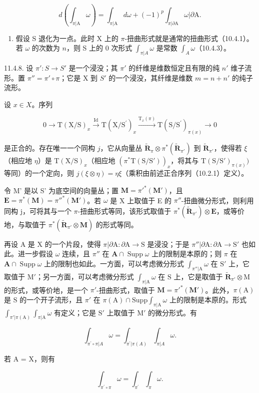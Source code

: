 \[
d \left(\int_ {\pi | \mathrm{A}} \omega\right) = \int_ {\pi | \mathrm{A}} d \omega + (- 1) ^ {p} \int_ {\pi | \partial \mathrm{A}} \omega | \partial \mathrm{A}.
\]

\begin{enumerate}
\def\labelenumi{\alph{enumi})}
\setcounter{enumi}{4}
\tightlist
\item
  假设 S 退化为一点。此时 X 上的 \(\pi\)-扭曲形式就是通常的扭曲形式（10.4.1）。若 \(\omega\) 的次数为 \(n\)，则 S 上的 0 次形式 \(\int_{\pi|A} \omega\) 是常数 \(\int_{A} \omega\)（10.4.3）。
\end{enumerate}

11.4.8. 设 \(\pi': S \to S'\) 是一个浸没；其 \(\pi'\) 的纤维是维数恒定且有限的纯 \(n'\) 维子流形。置 \(\pi'' = \pi' \circ \pi\)；它是 X 到 \(S'\) 的一个浸没，其纤维是维数 \(m = n + n'\) 的纯子流形。

设 \(x\in X\)。序列

\[
0 \longrightarrow \mathrm{T} (\mathrm{X} / \mathrm{S}) _ {x} \stackrel {\mathrm{Id}} {\longrightarrow} \mathrm{T} (\mathrm{X} / \mathrm{S} ^ {\prime}) _ {x} \stackrel {\mathrm{T} _ {x} (\pi)} {\longrightarrow} \mathrm{T} (\mathrm{S} / \mathrm{S} ^ {\prime}) _ {\pi (x)} \longrightarrow 0
\]

是正合的。存在唯一一个同构 \(j\)，它从向量丛 \(\tilde{\mathbf{R}}_{\pi} \otimes \pi^{*}(\tilde{\mathbf{R}}_{\pi'})\) 到 \(\tilde{\mathbf{R}}_{\pi'}\)，使得若 \(\xi\)（相应地 \(\eta\)）是 \(\mathrm{T}(\mathrm{X}/\mathrm{S})_x\)（相应地 \((\pi^{*}\mathrm{T}(\mathrm{S}/\mathrm{S}'))_x\)，将其与 \(\mathrm{T}(\mathrm{S}/\mathrm{S}')_{\pi(x)})\) 等同）的一个定向，则 \(j(\xi \otimes \eta) = \eta\xi\)（乘积由前述正合序列（10.2.1）定义）。

令 M' 是以 S' 为底空间的向量丛；置 \(\mathbf{M} = \pi'^{*}(\mathbf{M}')\)，且 \(\mathbf{E}=\pi^{*}(\mathbf{M})=\pi''^{*}(\mathbf{M}')\)。若 \(\omega\) 是 X 上取值于 E 的 \(\pi''\)-扭曲微分形式，则利用同构 j，可将其与一个 \(\pi\)-扭曲形式等同，该形式取值于 \(\pi^{*}(\tilde{\mathbf{R}}_{\pi'}) \otimes \mathbf{E}\)，或等价地，与取值于 \(\pi^{*}(\tilde{\mathbf{R}}_{\pi'} \otimes \mathbf{M})\) 的形式等同。

再设 A 是 X 的一个片段，使得 \(\pi|\partial\mathrm{A}:\partial\mathrm{A}\to\mathrm{S}\) 是浸没；于是 \(\pi''|\partial\mathrm{A}:\partial\mathrm{A}\to\mathrm{S}'\) 也如此。进一步假设 \(\omega\) 连续，且 \(\pi''\) 在 \(\mathbf{A}\cap\operatorname{Supp}\omega\) 上的限制是本原的；则 \(\pi\) 在 \(\mathbf{A}\cap\operatorname{Supp}\omega\) 上的限制也如此。一方面，可以考虑微分形式 \(\int_{\pi''|\mathrm{A}}\omega\) 在 \(\mathrm{S}'\) 上，它取值于 \(\mathrm{M}'\)；另一方面，可以考虑微分形式 \(\int_{\pi|\mathrm{A}}\omega\) 在 \(\mathrm{S}\) 上，它是取值于 \(\tilde{\mathbf{R}}_{\pi'}\otimes\mathrm{M}\) 的形式，或等价地，是一个 \(\pi'\)-扭曲形式，取值于 \(\mathbf{M}=\pi'^{*}(\mathbf{M}')\)。此外，\(\pi(\mathrm{A})\) 是 \(\mathrm{S}\) 的一个开子流形，且 \(\pi'\) 在 \(\pi(\mathrm{A})\cap\mathrm{Supp}\int_{\pi|\mathrm{A}}\omega\) 上的限制是本原的。形式 \(\int_{\pi'|\pi(\mathrm{A})}\int_{\pi|\mathrm{A}}\omega\) 有定义；它是 \(\mathrm{S}'\) 上取值于 \(\mathrm{M}'\) 的微分形式。有

\[
\int_ {\pi^ {\prime} \circ \pi | A} \omega = \int_ {\pi^ {\prime} | \pi (A)} \int_ {\pi | A} \omega .
\]

若 A = X，则有

\[
\int_ {\pi^ {\prime} \circ \pi} \omega = \int_ {\pi^ {\prime}} \int_ {\pi} \omega .
\]


